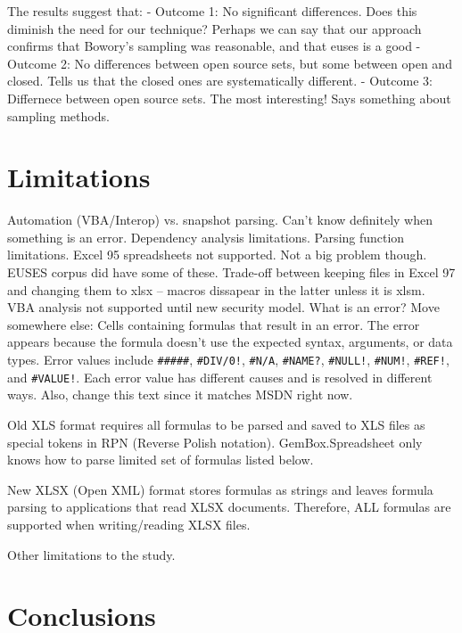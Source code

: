 \documentclass[conference]{IEEEtran}
\begin{document}
The results suggest that:
- Outcome 1: No significant differences. Does this diminish the need for our technique?
  Perhaps we can say that our approach confirms that Bowory's sampling was reasonable,
  and that euses is a good 
- Outcome 2: No differences between open source sets, but some between open and closed. 
  Tells us that the closed ones are systematically different.
- Outcome 3: Differnece between open source sets. The most interesting! Says something about 
  sampling methods.


\section{Limitations}

Automation (VBA/Interop) vs. snapshot parsing. Can't know definitely when
something is an error.
%
Dependency analysis limitations.
%
Parsing function limitations.
%
Excel 95 spreadsheets not supported. Not a big problem though. EUSES corpus did have some of these. Trade-off between keeping files in Excel 97 and changing them to xlsx -- macros dissapear in the latter unless it is xlsm.
%
VBA analysis not supported until new security model.
%
What is an error? Move somewhere else: Cells containing formulas that result in an error. The error appears because the formula doesn't use the expected syntax, arguments, or data types. Error values include \texttt{\#\#\#\#\#}, \texttt{\#DIV/0!}, \texttt{\#N/A}, \texttt{\#NAME?}, \texttt{\#NULL!}, \texttt{\#NUM!}, \texttt{\#REF!}, and \texttt{\#VALUE!}. Each error value has different causes and is resolved in different ways. Also, change this text since it matches MSDN right now.

Old XLS format requires all formulas to be parsed and saved to XLS files as special tokens in RPN (Reverse Polish notation). GemBox.Spreadsheet only knows how to parse limited set of formulas listed below.

New XLSX (Open XML) format stores formulas as strings and leaves formula parsing to applications that read XLSX documents. Therefore, ALL formulas are supported when writing/reading XLSX files.

Other limitations to the study.

\section{Conclusions}
\end{document}
